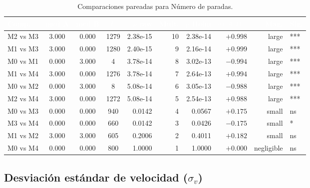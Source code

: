 \documentclass[12pt,a4paper,oneside]{book}
\begin{document}
\begin{table}[H]
\centering
\small
\caption{Comparaciones pareadas para Número de paradas.}
\renewcommand{\arraystretch}{1.15}
\begin{tabular}{lcccrrrrrl}
\toprule
\rowcolor{primary}
\textcolor{white}{\textbf{Comp.}} & \textcolor{white}{\textbf{med A}} & \textcolor{white}{\textbf{med B}} & \textcolor{white}{\textbf{$U$}} & \textcolor{white}{\textbf{$p$ raw}} & \textcolor{white}{\textbf{Mult.}} & \textcolor{white}{\textbf{$p$ Holm}} & \textcolor{white}{\textbf{$\delta(A,B)$}} & \textcolor{white}{\textbf{Mag.}} & \textcolor{white}{\textbf{Sig.}} \\
\midrule
M2 vs M3 & 3.000 & 0.000 & 1279 & 2.38e-15 & 10 & 2.38e-14 & $+0.998$ & large & *** \\
M1 vs M3 & 3.000 & 0.000 & 1280 & 2.40e-15 & 9 & 2.16e-14 & $+0.999$ & large & *** \\
M0 vs M1 & 0.000 & 3.000 & 4 & 3.78e-14 & 8 & 3.02e-13 & $-0.994$ & large & *** \\
M1 vs M4 & 3.000 & 0.000 & 1276 & 3.78e-14 & 7 & 2.64e-13 & $+0.994$ & large & *** \\
M0 vs M2 & 0.000 & 3.000 & 8 & 5.08e-14 & 6 & 3.05e-13 & $-0.988$ & large & *** \\
M2 vs M4 & 3.000 & 0.000 & 1272 & 5.08e-14 & 5 & 2.54e-13 & $+0.988$ & large & *** \\
M0 vs M3 & 0.000 & 0.000 & 940 & 0.0142 & 4 & 0.0567 & $+0.175$ & small & ns \\
M3 vs M4 & 0.000 & 0.000 & 660 & 0.0142 & 3 & 0.0426 & $-0.175$ & small & * \\
M1 vs M2 & 3.000 & 3.000 & 605 & 0.2006 & 2 & 0.4011 & $+0.182$ & small & ns \\
M0 vs M4 & 0.000 & 0.000 & 800 & 1.0000 & 1 & 1.0000 & $+0.000$ & negligible & ns \\
\bottomrule
\end{tabular}
\end{table}

\subsection{Desviación estándar de velocidad ($\sigma_v$)}
\end{document}
